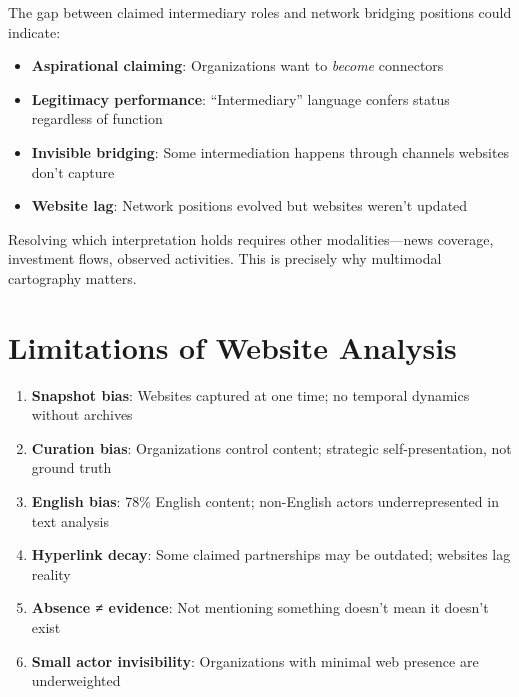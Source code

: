 \documentclass[../main.tex]{subfiles}
\begin{document}
\begin{criticalbox}
The gap between claimed intermediary roles and network bridging positions could indicate:
\begin{itemize}[leftmargin=*, itemsep=0.1em]
\item \textbf{Aspirational claiming}: Organizations want to \emph{become} connectors
\item \textbf{Legitimacy performance}: ``Intermediary'' language confers status regardless of function
\item \textbf{Invisible bridging}: Some intermediation happens through channels websites don't capture
\item \textbf{Website lag}: Network positions evolved but websites weren't updated
\end{itemize}
Resolving which interpretation holds requires other modalities---news coverage, investment flows, observed activities. This is precisely why multimodal cartography matters.
\end{criticalbox}


\section*{Limitations of Website Analysis}

\begin{criticalbox}
\begin{enumerate}[leftmargin=*, itemsep=0.3em]
\item \textbf{Snapshot bias}: Websites captured at one time; no temporal dynamics without archives
\item \textbf{Curation bias}: Organizations control content; strategic self-presentation, not ground truth
\item \textbf{English bias}: 78\% English content; non-English actors underrepresented in text analysis
\item \textbf{Hyperlink decay}: Some claimed partnerships may be outdated; websites lag reality
\item \textbf{Absence ≠ evidence}: Not mentioning something doesn't mean it doesn't exist
\item \textbf{Small actor invisibility}: Organizations with minimal web presence are underweighted
\end{enumerate}
\end{criticalbox}
\end{document}
